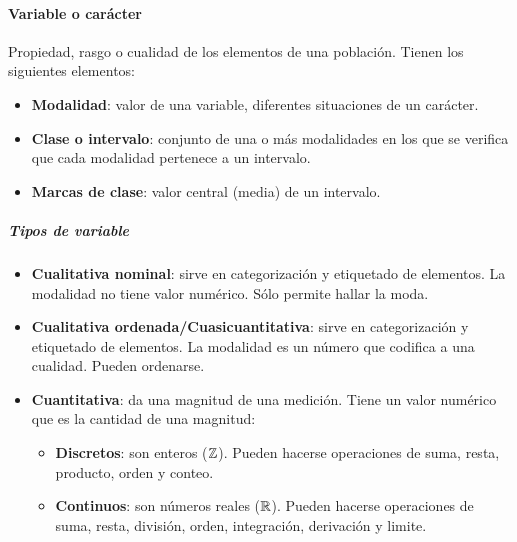 \paragraph{Variable o carácter} Propiedad, rasgo o cualidad de los elementos de una población. Tienen los siguientes elementos:
\begin{itemize}[itemsep=0pt,parsep=0pt,topsep=0pt,partopsep=0pt]
    \item \textbf{Modalidad}: valor de una variable, diferentes situaciones de un carácter.
    \item\textbf{Clase o intervalo}: conjunto de una o más modalidades en los que se verifica que cada modalidad pertenece a un intervalo.
    \item\textbf{Marcas de clase}: valor central (media) de un intervalo.
\end{itemize}
\subparagraph{Tipos de variable}
\begin{itemize}[itemsep=0pt,parsep=0pt,topsep=0pt,partopsep=0pt]
    \item \textbf{Cualitativa nominal}: sirve en categorización y etiquetado de elementos. La modalidad no tiene valor numérico. Sólo permite hallar la moda.
    \item\textbf{Cualitativa ordenada/Cuasicuantitativa}: sirve en categorización y etiquetado de elementos. La modalidad es un número que codifica a una cualidad. Pueden ordenarse.
    \item\textbf{Cuantitativa}: da una magnitud de una medición. Tiene un valor numérico que es la cantidad de una magnitud:
    \begin{itemize}[itemsep=0pt,parsep=0pt,topsep=0pt,partopsep=0pt]
        \item \textbf{Discretos}: son enteros ($\mathbb{Z}$). Pueden hacerse operaciones de suma, resta, producto, orden y conteo.
        \item\textbf{Continuos}: son números reales ($\mathbb{R}$). Pueden hacerse operaciones de suma, resta, división, orden, integración, derivación y limite.
    \end{itemize}
\end{itemize}

